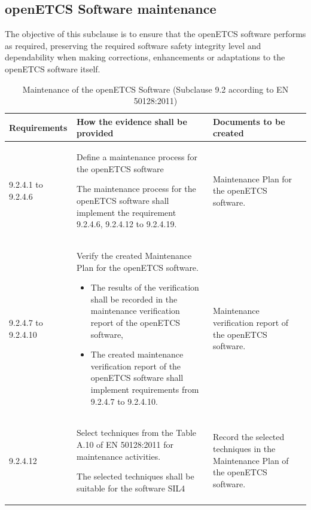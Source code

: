 \documentclass{template/openetcs_report}
\begin{document}
\subsection{openETCS Software maintenance}
\begin{flushleft}
The objective of this subclause is to ensure that the openETCS software performs as required, preserving the required software safety integrity level and dependability when making corrections, enhancements or adaptations to the openETCS software itself. 
\end{flushleft}
{\footnotesize\sffamily\centering
\begin{longtable}{|p{2cm}|p{9cm}|p{3cm}|}
\caption{Maintenance of the openETCS Software (Subclause 9.2 according to EN 50128:2011)}\\
\hline
\bfseries Requirements & \bfseries How the evidence shall be provided & \bfseries Documents to be created\\
\hline
\hline
\endhead
\hline
\endfoot

9.2.4.1 to 9.2.4.6 & Define a maintenance process for the openETCS software

The maintenance process for the openETCS software shall implement the requirement 9.2.4.6, 9.2.4.12 to 9.2.4.19. 
& Maintenance Plan for the openETCS software.\\ 
\hline
9.2.4.7 to 9.2.4.10 & Verify the created Maintenance Plan for the openETCS software.
\begin{itemize}\itemsep=0pt
  \item The results of the verification shall be recorded in the maintenance verification report of the openETCS software,
  \item The created maintenance verification report of the openETCS software shall implement requirements from 9.2.4.7 to 9.2.4.10. 
\end{itemize}
& Maintenance verification report of the openETCS software.\\ 
\hline
9.2.4.12 & Select techniques from the Table A.10 of EN 50128:2011 for maintenance activities. 

The selected techniques shall be suitable for the software SIL4 
& Record the selected techniques in the Maintenance Plan of the openETCS software.\\ 

\end{longtable}}
\end{document}
